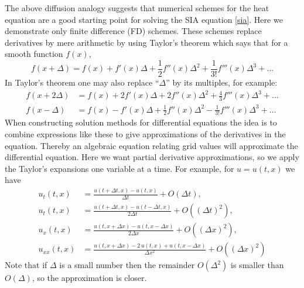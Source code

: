 \documentclass[letterpaper,final,12pt,reqno]{amsart}
\begin{document}
The above diffusion analogy suggests that numerical schemes for the heat equation are a good starting point for solving the SIA equation \eqref{sia}.  Here we demonstrate only finite difference (FD) schemes.  These schemes replace derivatives by mere arithmetic by using Taylor's theorem which says that for a smooth function $f(x)$,
	$$f(x+\Delta) = f(x) + f'(x) \Delta + \frac{1}{2} f''(x) \Delta^2 + \frac{1}{3!} f'''(x) \Delta^3 + \dots$$
In Taylor's theorem one may also replace ``$\Delta$'' by its multiples, for example:
\begin{align*}
f(x+2\Delta) &= f(x) + 2 f'(x) \Delta + 2 f''(x) \Delta^2 + \frac{4}{3} f'''(x) \Delta^3 + \dots \\
f(x-\Delta) &= f(x) - f'(x) \Delta + \frac{1}{2} f''(x) \Delta^2 - \frac{1}{3!} f'''(x) \Delta^3 + \dots
\end{align*}
When constructing solution methods for differential equations the idea is to combine expressions like these to give approximations of the derivatives in the equation.  Thereby an algebraic equation relating grid values will approximate the differential equation.  Here we want partial derivative approximations, so we apply the Taylor's expansions one variable at a time.  For example, for $u=u(t,x)$ we have
\begin{align*}
u_t(t,x) &= \frac{u(t+\Delta t,x) - u(t,x)}{\Delta t} + O(\Delta t), \\
u_t(t,x) &= \frac{u(t+\Delta t,x) - u(t-\Delta t,x)}{2\Delta t} + O((\Delta t)^2), \\
u_x(t,x) &= \frac{u(t,x+\Delta x) - u(t,x-\Delta x)}{2\Delta x} + O((\Delta x)^2), \\
u_{xx}(t,x) &= \frac{u(t,x+\Delta x) - 2\, u(t,x) + u(t,x-\Delta x)}{\Delta x^2} + O((\Delta x)^2)
\end{align*}
Note that if $\Delta$ is a small number then the remainder $O(\Delta^2)$ is smaller than $O(\Delta)$, so the approximation is closer.
\end{document}
